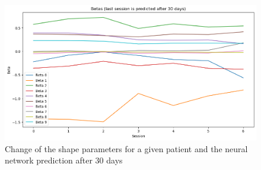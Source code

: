 \begin{figure}[h]
    \centering
    \includegraphics[width=\textwidth]{files/predicted_betas}
    \caption{Change of the shape parameters for a given patient and the neural
        network prediction after 30 days}
\end{figure}